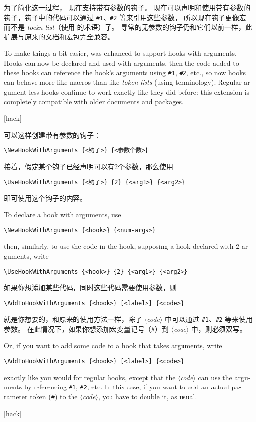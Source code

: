 \documentclass{ltnews}
\providecommand\meta[1]{$\langle$\textrm{\itshape#1}$\rangle$}
\begin{document}
为了简化这一过程， 现在支持带有参数的钩子。
现在可以声明和使用带有参数的钩子，钩子中的代码可以通过 \verb|#1|、\verb|#2| 等来引用这些参数，
所以现在钩子更像宏而不是 \emph{toekn list}（使用  的术语）了。
寻常的无参数的钩子仍和它们以前一样，此扩展与原来的文档和宏包完全兼容。

\begin{english}
To make things a bit easier,  was enhanced to support hooks
with arguments.  Hooks can now be declared and used with arguments, then
the code added to these hooks can reference the hook's arguments using
\verb|#1|, \verb|#2|, etc., so now hooks can behave more like macros
than like \emph{token lists} (using  terminology).  Regular
argument-less hooks continue to work exactly like they did before:  this
extension is completely compatible with older documents and packages.
\end{english}

[hack]{\small}

可以这样创建带有参数的钩子：
\begin{verbatim}
\NewHookWithArguments {<钩子>} {<参数个数>}
\end{verbatim}
接着，假定某个钩子已经声明可以有2个参数，那么使用
\begin{verbatim}
\UseHookWithArguments {<钩子>} {2} {<arg1>} {<arg2>}
\end{verbatim}
即可使用这个钩子的内容。

\begin{english}
To declare a hook with arguments, use
\begin{verbatim}
\NewHookWithArguments {<hook>} {<num-args>}
\end{verbatim}
then, similarly, to use the code in the hook, supposing a hook declared
with 2 arguments, write
\begin{verbatim}
\UseHookWithArguments {<hook>} {2} {<arg1>} {<arg2>}
\end{verbatim}
\end{english}

如果你想添加某些代码，同时这些代码需要使用参数，则 
\begin{verbatim}
\AddToHookWithArguments {<hook>} [<label>] {<code>}
\end{verbatim}
就是你想要的，和原来的使用方法一样，除了 \meta{code} 中可以通过 
\verb|#1|、\verb|#2| 等来使用参数。
在此情况下，如果你想添加宏变量记号（\verb|#|）到 \meta{code} 中，则必须双写。

\begin{english}
Or, if you want to add some code to a hook that takes arguments, write
\begin{verbatim}
\AddToHookWithArguments {<hook>} [<label>] {<code>}
\end{verbatim}
exactly like you would for regular hooks, except that the \meta{code}
can use the arguments by referencing \verb|#1|, \verb|#2|, etc.  In this
case, if you want to add an actual parameter token (\verb|#|) to the
\meta{code}, you have to double it, as usual.
\end{english}
[hack]
\end{document}
